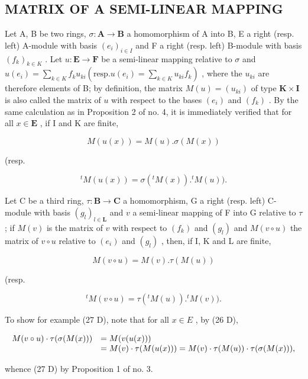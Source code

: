 \subsection{MATRIX OF A SEMI-LINEAR MAPPING}

Let A, B be two rings, \(\sigma: \mathbf{A} \to \mathbf{B}\) a homomorphism of A into B, E a right (resp. left) A-module with basis \((e_i)_{i \in I}\) and F a right (resp. left) B-module with basis \((f_k)_{k\in K}\) . Let \(u:\mathbf{E}\to \mathbf{F}\) be a semi-linear mapping relative to \(\sigma\) and \(u(e_i) = \sum_{k\in K}f_ku_{ki}\left(\text{resp.} u(e_i) = \sum_{k\in K}u_{ki}f_k\right)\) , where the \(u_{ki}\) are therefore elements of B; by definition, the matrix \(M(u) = (u_{ki})\) of type \(\mathbf{K}\times \mathbf{I}\) is also called the matrix of \(u\) with respect to the bases \((e_i)\) and \((f_k)\) . By the same calculation as in Proposition 2 of no. 4, it is immediately verified that for all \(x\in \mathbf{E}\) , if I and K are finite,

\[
M (u (x)) = M (u). \sigma (M (x))\tag{26 D}
\]

(resp.

\[
{ } ^ { t } M ( u ( x ) ) = \sigma ( { } ^ { t } M ( x ) ) . { } ^ { t } M ( u ) ) .\tag{26 G}
\]

Let C be a third ring, \(\tau: \mathbf{B} \to \mathbf{C}\) a homomorphism, G a right (resp. left) C-module with basis \((g_l)_{l \in \mathbf{L}}\) and \(v\) a semi-linear mapping of F into G relative to \(\tau\) ; if \(M(v)\) is the matrix of \(v\) with respect to \((f_k)\) and \((g_l)\) and \(M(v \circ u)\) the matrix of \(v \circ u\) relative to \((e_i)\) and \((g_l)\) , then, if I, K and L are finite,

\[
M (v \circ u) = M (v). \tau (M (u))\tag{27 D}
\]

(resp.

\[
{ } ^ { t } M ( v \circ u ) = \tau ( { } ^ { t } M ( u ) ) . { } ^ { t } M ( v ) ) .\tag{27 G}
\]

To show for example (27 D), note that for all \(x \in E\) , by (26 D),

\[
\begin{array}{r l} M (v \circ u) \cdot \tau (\sigma (M (x))) & = M (v (u (x))) \\ & = M (v) \cdot \tau (M (u (x))) = M (v) \cdot \tau (M (u)) \cdot \tau (\sigma (M (x))), \end{array}
\]

whence (27 D) by Proposition 1 of no. 3.

